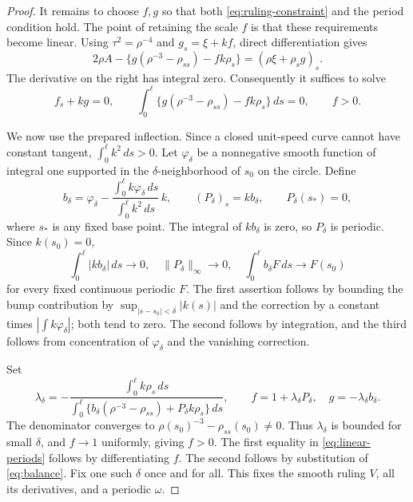 \documentclass[11pt]{amsart}
\theoremstyle{definition}
\begin{document}
\begin{proof}
It remains to choose $f,g$ so that both
\eqref{eq:ruling-constraint} and the period condition hold.
The point of retaining the scale $f$ is that these requirements
become linear. Using $\tau^2=\rho^{-4}$ and
$g_s=\xi+kf$, direct differentiation gives
\begin{equation}\label{eq:period-identity}
 2\rho A-\{g(\rho^{-3}-\rho_{ss})-fk\rho_s\}
       =(\rho\xi+\rho_sg)_s.
\end{equation}
The derivative on the right has integral zero. Consequently it
suffices to solve
\begin{equation}\label{eq:linear-periods}
 f_s+kg=0,\qquad
 \int_0^\ell\{g(\rho^{-3}-\rho_{ss})-fk\rho_s\}\,ds=0,
 \qquad f>0.
\end{equation}

We now use the prepared inflection. Since a closed unit-speed curve
cannot have constant tangent, $\int_0^\ell k^2\,ds>0$.
Let $\varphi_\delta$ be a nonnegative smooth function of integral
one supported in the $\delta$-neighborhood of $s_0$ on the circle.
Define
\[
 b_\delta=\varphi_\delta-
       \frac{\int_0^\ell k\varphi_\delta\,ds}
            {\int_0^\ell k^2\,ds}\,k,\qquad
 (P_\delta)_s=kb_\delta,\qquad P_\delta(s_*)=0,
\]
where $s_*$ is any fixed base point.
The integral of $kb_\delta$ is zero, so $P_\delta$ is periodic.
Since $k(s_0)=0$,
\[
 \int_0^\ell|kb_\delta|\,ds\longrightarrow0,\quad
 \|P_\delta\|_\infty\longrightarrow0,\quad
 \int_0^\ell b_\delta F\,ds\longrightarrow F(s_0)
\]
for every fixed continuous periodic $F$.
The first assertion follows by bounding the bump contribution by
$\sup_{|s-s_0|<\delta}|k(s)|$ and the correction by a constant
times $|\int k\varphi_\delta|$; both tend to zero.
The second follows by integration, and the third follows from
concentration of $\varphi_\delta$ and the vanishing correction.

Set
\begin{equation}\label{eq:balance}
 \lambda_\delta=
 -\frac{\int_0^\ell k\rho_s\,ds}
 {\int_0^\ell\{b_\delta(\rho^{-3}-\rho_{ss})
                         +P_\delta k\rho_s\}\,ds},
 \qquad
 f=1+\lambda_\delta P_\delta,\quad g=-\lambda_\delta b_\delta .
\end{equation}
The denominator converges to
$\rho(s_0)^{-3}-\rho_{ss}(s_0)\ne0$.
Thus $\lambda_\delta$ is bounded for small $\delta$, and
$f\to1$ uniformly, giving $f>0$. The first equality in
\eqref{eq:linear-periods} follows by differentiating $f$.
The second follows by substitution of \eqref{eq:balance}.
Fix one such $\delta$ once and for all. This fixes the smooth
ruling $V$, all its derivatives, and a periodic $\omega$.


\end{proof}
\end{document}
